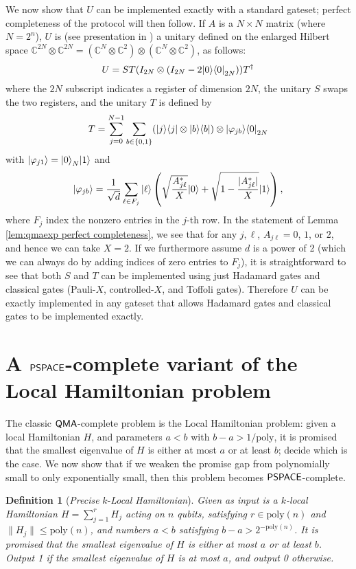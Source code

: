 \documentclass[11pt]{article}
\newtheorem{definition}{Definition}
\theoremstyle{definition}
\theoremstyle{remark}
\newcommand\QMA{{\sf{QMA}}}
\newcommand\PSPACE{{\sf{PSPACE}}}
\newcommand\preciseklh{\textit{Precise }$k$-\textit{Local Hamiltonian}}
\newcommand{\poly}{\mathrm{poly}}
\begin{document}
We now show that $U$ can be implemented exactly with a standard gateset; perfect completeness of the protocol will then follow. If $A$ is a $N \times N$ matrix (where $N=2^n$), $U$ is (see presentation in \cite[Section~3.1~and~Lemma~10]{berry15}) a unitary defined on the enlarged Hilbert space $\mathbb{C}^{2N} \otimes \mathbb{C}^{2N} = (\mathbb{C}^{N} \otimes \mathbb{C}^2) \otimes  (\mathbb{C}^{N} \otimes \mathbb{C}^2)$, as follows:
\begin{equation}
U = ST(I_{2N} \otimes (I_{2N} - 2{\left\vert{0}\right\rangle}{\left\langle{0}\right\vert}_{2N})) T^\dagger
\end{equation}
where the $2N$ subscript indicates a register of dimension $2N$, the unitary $S$ swaps the two registers, and the unitary $T$ is defined by
\begin{equation}
T = \sum_{j=0}^{N-1}\sum_{b \in \{0,1\}} ({\left\vert{j}\right\rangle}{\left\langle{j}\right\vert} \otimes {\left\vert{b}\right\rangle}{\left\langle{b}\right\vert}) \otimes {\left\vert{\varphi_{jb}}\right\rangle}{\left\langle{0}\right\vert}_{2N}
\end{equation}
with ${\left\vert{\varphi_{j1}}\right\rangle} = {\left\vert{0}\right\rangle}_N{\left\vert{1}\right\rangle}$ and
\begin{equation}
{\left\vert{\varphi_{jb}}\right\rangle} = \frac{1}{\sqrt{d}} \sum_{\ell \in F_j} {\left\vert{\ell}\right\rangle}\left(\sqrt{\frac{A^*_{j\ell}}{X}}{\left\vert{0}\right\rangle} + \sqrt{1-\frac{|A^*_{j\ell}|}{X}}{\left\vert{1}\right\rangle}\right),
\end{equation}
where $F_j$ index the nonzero entries in the $j$-th row. In the statement of Lemma \ref{lem:qmaexp perfect completeness}, we see that for any $j,\ell$, $A_{j\ell}=0$, $1$, or $2$, and hence we can take $X=2$. If we furthermore assume $d$ is a power of 2 (which we can always do by adding indices of zero entries to $F_j$), it is straightforward to see that both $S$ and $T$ can be implemented using just Hadamard gates and classical gates (Pauli-$X$, controlled-$X$, and Toffoli gates). Therefore $U$ can be exactly implemented in any gateset that allows Hadamard gates and classical gates to be implemented exactly.

\section{A $\PSPACE$-complete variant of the Local Hamiltonian problem}
The classic $\QMA$-complete problem is the Local Hamiltonian problem: given a local Hamiltonian $H$, and parameters $a < b$ with $b-a > 1/\poly$, it is promised that the smallest eigenvalue of $H$ is either at most $a$ or at least $b$; decide which is the case. We now show that if we weaken the promise gap from polynomially small to only exponentially small, then this problem becomes $\PSPACE$-complete.
\begin{definition}[\preciseklh]
Given as input is a $k$-local Hamiltonian $H=\sum_{j=1}^rH_j$ acting on $n$ qubits, satisfying $r \in \poly(n)$ and $\|H_j\| \le \poly(n)$, and numbers $a < b$ satisfying $b - a > 2^{-\poly(n)}$. It is promised that the smallest eigenvalue of $H$ is either at most $a$ or at least $b$. Output 1 if the smallest eigenvalue of $H$ is at most $a$, and output 0 otherwise.
\end{definition}
\end{document}
